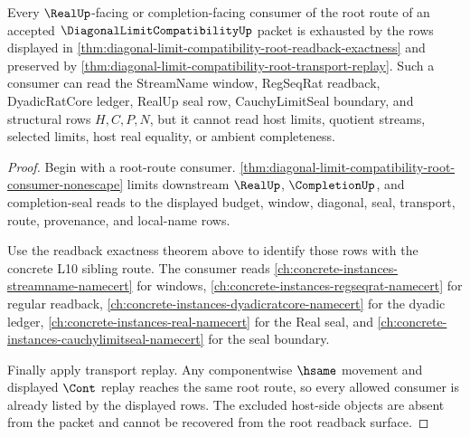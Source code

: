 \begin{theorem}
\label{thm:diagonal-limit-compatibility-root-consumer-coverage}
Every $\RealUp$-facing or completion-facing consumer of the root route of an accepted $\DiagonalLimitCompatibilityUp$ packet is exhausted by the rows displayed in \autoref{thm:diagonal-limit-compatibility-root-readback-exactness} and preserved by \autoref{thm:diagonal-limit-compatibility-root-transport-replay}. Such a consumer can read the StreamName window, RegSeqRat readback, DyadicRatCore ledger, RealUp seal row, CauchyLimitSeal boundary, and structural rows $H,C,P,N$, but it cannot read host limits, quotient streams, selected limits, host real equality, or ambient completeness.
\end{theorem}
\begin{proof}
Begin with a root-route consumer. \autoref{thm:diagonal-limit-compatibility-root-consumer-nonescape} limits downstream $\RealUp$, $\CompletionUp$, and completion-seal reads to the displayed budget, window, diagonal, seal, transport, route, provenance, and local-name rows.

Use the readback exactness theorem above to identify those rows with the concrete L10 sibling route. The consumer reads \autoref{ch:concrete-instances-streamname-namecert} for windows, \autoref{ch:concrete-instances-regseqrat-namecert} for regular readback, \autoref{ch:concrete-instances-dyadicratcore-namecert} for the dyadic ledger, \autoref{ch:concrete-instances-real-namecert} for the Real seal, and \autoref{ch:concrete-instances-cauchylimitseal-namecert} for the seal boundary.

Finally apply transport replay. Any componentwise $\hsame$ movement and displayed $\Cont$ replay reaches the same root route, so every allowed consumer is already listed by the displayed rows. The excluded host-side objects are absent from the packet and cannot be recovered from the root readback surface.
\end{proof}

